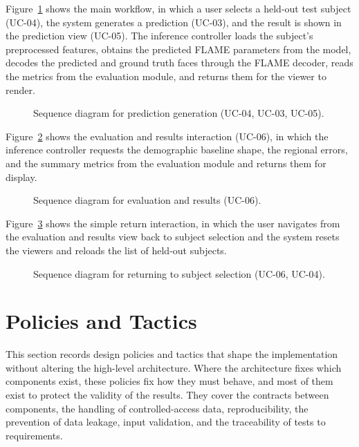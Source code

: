 Figure~\ref{fig:seq1} shows the main workflow, in which a user selects a held-out test subject (UC-04), the system generates a prediction (UC-03), and the result is shown in the prediction view (UC-05). The inference controller loads the subject's preprocessed features, obtains the predicted FLAME parameters from the model, decodes the predicted and ground truth faces through the FLAME decoder, reads the metrics from the evaluation module, and returns them for the viewer to render.

\begin{figure}
\centering{}

\caption{Sequence diagram for prediction generation (UC-04, UC-03, UC-05).}
\label{fig:seq1}
\end{figure}

Figure~\ref{fig:seq2} shows the evaluation and results interaction (UC-06), in which the inference controller requests the demographic baseline shape, the regional errors, and the summary metrics from the evaluation module and returns them for display.

\begin{figure}
\centering{}

\caption{Sequence diagram for evaluation and results (UC-06).}
\label{fig:seq2}
\end{figure}

Figure~\ref{fig:seq3} shows the simple return interaction, in which the user navigates from the evaluation and results view back to subject selection and the system resets the viewers and reloads the list of held-out subjects.

\begin{figure}[!ht]
\centering{}

\caption{Sequence diagram for returning to subject selection (UC-06, UC-04).}
\label{fig:seq3}
\end{figure}

\section{Policies and Tactics}
This section records design policies and tactics that shape the implementation without altering the high-level architecture. Where the architecture fixes which components exist, these policies fix how they must behave, and most of them exist to protect the validity of the results. They cover the contracts between components, the handling of controlled-access data, reproducibility, the prevention of data leakage, input validation, and the traceability of tests to requirements.

